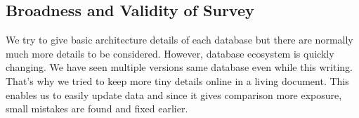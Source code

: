 \subsection{Broadness and Validity of Survey}

We try to give basic architecture details of each database but there are normally much more details to be considered. However, database ecosystem is quickly changing. We have seen multiple versions same database even while this writing. That's why we tried to keep more tiny details online in a living document. This enables us to easily update data and since it gives comparison more exposure, small mistakes are found and fixed earlier.
